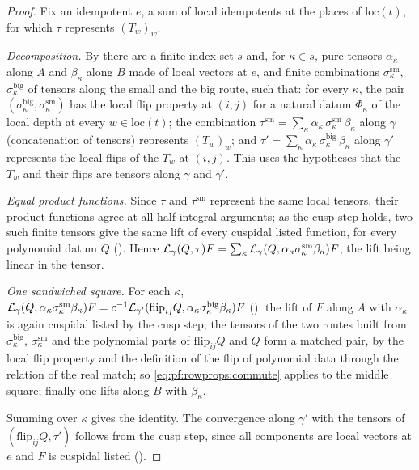 \begin{proof}
Fix an idempotent $e$, a sum of local idempotents at the places of $\mathrm{loc}(t)$, for which $\tau$ represents
$(T_w)_w$.

\emph{Decomposition.} By  there are a finite index set $s$ and, for
$\kappa\in s$, pure tensors $\alpha_\kappa$ along $A$ and $\beta_\kappa$ along $B$ made of local vectors at $e$, and finite
combinations $\sigma^{\mathrm{sm}}_\kappa$, $\sigma^{\mathrm{big}}_\kappa$ of tensors along the small and the big route,
such that: for every $\kappa$, the pair $(\sigma^{\mathrm{big}}_\kappa,\sigma^{\mathrm{sm}}_\kappa)$ has the local flip
property at $(i,j)$ for a natural datum $\Phi_\kappa$ of the local depth at every $w\in\mathrm{loc}(t)$; the combination
$\tau^{\mathrm{sm}}=\sum_\kappa\alpha_\kappa\,\sigma^{\mathrm{sm}}_\kappa\,\beta_\kappa$ along $\gamma$ (concatenation of
tensors) represents $(T_w)_w$; and $\tau'=\sum_\kappa\alpha_\kappa\,\sigma^{\mathrm{big}}_\kappa\,\beta_\kappa$ along $\gamma'$
represents the local flips of the $T_w$ at $(i,j)$. This uses the hypotheses that the $T_w$ and their flips are tensors
along $\gamma$ and $\gamma'$.

\emph{Equal product functions.} Since $\tau$ and $\tau^{\mathrm{sm}}$ represent the same local tensors, their product
functions agree at all half-integral arguments; as the cusp step holds, two such finite tensors give the same lift of every
cuspidal listed function, for every polynomial datum $Q$ ().
Hence $\mathcal{L}_\gamma(Q,\tau)F=\sum_\kappa\mathcal{L}_\gamma(Q,\alpha_\kappa\sigma^{\mathrm{sm}}_\kappa\beta_\kappa)F$, the lift
being linear in the tensor.

\emph{One sandwiched square.} For each $\kappa$,
$\mathcal{L}_\gamma(Q,\alpha_\kappa\sigma^{\mathrm{sm}}_\kappa\beta_\kappa)F=c^{-1}\mathcal{L}_{\gamma'}(\mathrm{flip}_{ij}Q,
\alpha_\kappa\sigma^{\mathrm{big}}_\kappa\beta_\kappa)F$ ():
the lift of $F$ along $A$ with $\alpha_\kappa$ is again cuspidal listed by the cusp step; the tensors of the two routes built
from $\sigma^{\mathrm{big}}_\kappa$, $\sigma^{\mathrm{sm}}_\kappa$ and the polynomial parts of $\mathrm{flip}_{ij}Q$ and
$Q$ form a matched pair, by the local flip property and the definition of the flip of polynomial data through the
relation of the real match; so \eqref{eq:pf:rowprops:commute} applies to the middle square; finally one lifts along $B$
with $\beta_\kappa$.

Summing over $\kappa$ gives the identity. The convergence along $\gamma'$ with the tensors of
$(\mathrm{flip}_{ij}Q,\tau')$ follows from the cusp step, since all components are local vectors at $e$ and $F$ is cuspidal
listed ().
\end{proof}

